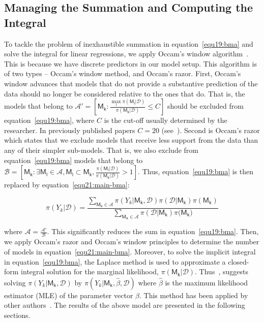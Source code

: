 \documentclass[12pt, english]{article}
\begin{document}
    \subsection{Managing the Summation and Computing the Integral}\label{subsec5.1:managing-the-summation-and-computing-the-integral}
    To tackle the problem of inexhaustible summation in equation~\ref{equ19:bma} and solve the integral for linear regressions, we apply Occam’s window algorithm~\parencites{madigan1995, madiganraftery1994, rafteryetal1993}. This is because we have discrete predictors in our model setup. This algorithm is of two types – Occam’s window method, and Occam’s razor. First, Occam’s window advances that models that do not provide a substantive prediction of the data should no longer be considered relative to the ones that do. That is, the models that belong to $\mathscr{A'} = \left[{\mathsf{M_k:} \frac{\max \limits_{l}{\pi(\mathsf{M_l} | \mathcal{D})}}{\pi(\mathsf{M_k} |\mathcal{D})} \leqslant C}\right]$ should be excluded from equation~\ref{equ19:bma}, where $C$ is the cut-off usually determined by the researcher. In previously published papers $C = 20$ (see~\parencite{madigan1995, draper1995, raftery1993, rafteryetal1993}). Second is Occam’s razor which states that we exclude models that receive less support from the data than any of their simpler sub-models. That is, we also exclude from equation~\ref{equ19:bma} models that belong to $\mathscr{B} = \left[\mathsf{M_k:} \exists \mathsf{M_l} \in \mathscr{A}, \mathsf{M_l} \subset \mathsf{M_k}, \frac{\pi(\mathsf{M_l} | \mathcal{D})}{\pi(\mathsf{M_k} | \mathcal{D})} > 1 \right]$. Thus, equation~\ref{equ19:bma} is then replaced by equation~\ref{equ21:main-bma}:

    \begin{equation}
        \label{equ21:main-bma}
        \pi(Y_k | \mathcal{D}) = \frac{\sum_{\mathsf{M_k} \in \mathscr{A}} \pi(Y_k | \mathsf{M_k}, \mathcal{D}) \pi(\mathcal{D} | \mathsf{M_k}) \pi(\mathsf{M_k})}{\sum_{\mathsf{M_k} \in \mathscr{A}} \pi(\mathcal{D} | \mathsf{M_k}) \pi(\mathsf{M_k)}}
    \end{equation}

    where $\mathscr{A} = \frac{\mathscr{A'}}{\mathscr{B}}$. This significantly reduces the sum in equation~\ref{equ19:bma}. Then, we apply Occam’s razor and Occam’s window principles to determine the number of models in equation~\ref{equ21:main-bma}. Moreover, to solve the implicit integral in equation~\ref{equ19:bma}, the Laplace method is used to approximate a closed-form integral solution for the marginal likelihood, $\pi(\mathsf{M_k} | \mathcal{D})$. Thus~\cite{taplin1993}, suggests solving $\pi(Y_k | \mathsf{M_k}, \mathcal{D})$ by $\pi(Y_k | \mathsf{M_k}, \hat{\beta}, \mathcal{D})$ where $\hat{\beta}$ is the maximum likelihood estimator (MLE) of the parameter vector $\beta$. This method has been applied by other authors~\parencites{volinsky1997, rafteryetal1996, draper1995}. The results of the above model are presented in the following sections.
\end{document}
